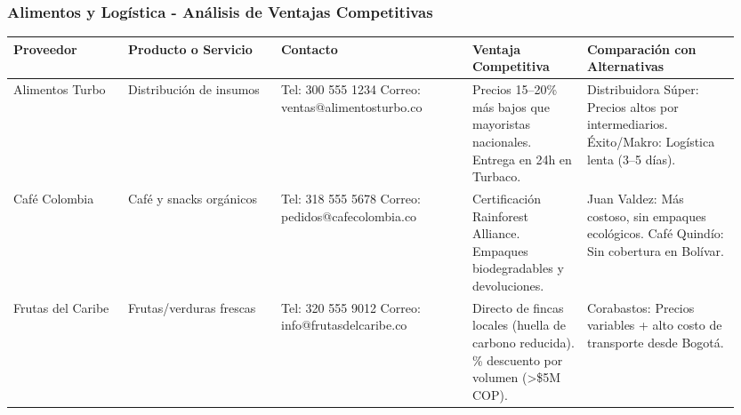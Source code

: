 \documentclass[letterpaper, 11pt]{report}
\begin{document}
\subsubsection{Alimentos y Logística - Análisis de Ventajas Competitivas}

\begin{longtable}{|p{0.15\linewidth}|p{0.20\linewidth}|p{0.25\linewidth}|p{0.15\linewidth}|p{0.20\linewidth}|}
      \hline
      \textbf{Proveedor}                                                                                                      & \textbf{Producto o Servicio} & \textbf{Contacto}                                                     & \textbf{Ventaja Competitiva} & \textbf{Comparación con Alternativas} \\
      \hline
      Alimentos Turbo                                                                                                         & Distribución de insumos      & Tel: 300 555 1234 \hfil \break Correo: ventas@alimentosturbo.co       &
      Precios 15--20\% más bajos que mayoristas nacionales. \hfil \break Entrega en 24h en Turbaco.                           &
      Distribuidora Súper: Precios altos por intermediarios. \hfil \break Éxito/Makro: Logística lenta (3--5 días).                                                                                                                                                                                         \\
      \hline
      Café Colombia                                                                                                           & Café y snacks orgánicos      & Tel: 318 555 5678 \hfil \break Correo: pedidos@cafecolombia.co        &
      Certificación Rainforest Alliance. \hfil \break Empaques biodegradables y devoluciones.                                 &
      Juan Valdez: Más costoso, sin empaques ecológicos. \hfil \break Café Quindío: Sin cobertura en Bolívar.                                                                                                                                                                                               \\
      \hline
      Frutas del Caribe                                                                                                       & Frutas/verduras frescas      & Tel: 320 555 9012 \hfil \break Correo: info@frutasdelcaribe.co        &
      Directo de fincas locales (huella de carbono reducida). \hfil \break 10\% descuento por volumen (\textgreater\$5M COP). &
      Corabastos: Precios variables + alto costo de transporte desde Bogotá.                                                                                                                                                                                                                                \\

\end{longtable}
\end{document}
